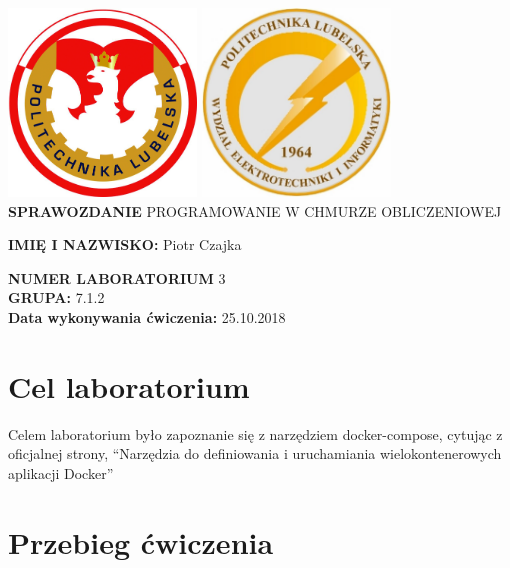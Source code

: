 \documentclass[12pt]{article}
\begin{document}
    \centering
    \includegraphics[width=5cm, height=5cm,]{herbPL.jpg}
    \hspace{2cm}
    \includegraphics[width=5cm, height=5cm]{herbWEII.jpg}\\
    \vspace{2cm}
    {\Huge \textbf{SPRAWOZDANIE}}
    \vspace{2cm}
    \newline
    {\large PROGRAMOWANIE W CHMURZE OBLICZENIOWEJ}
    \vfill

    \raggedright{}

    \textbf{IMIĘ I NAZWISKO:} Piotr Czajka

    \textbf{NUMER LABORATORIUM} 3\\
    \textbf{GRUPA:} 7.1.2\\
    \textbf{Data wykonywania ćwiczenia:} 25.10.2018\\

    \newpage

    \tableofcontents{}

    \newpage

    \section{Cel laboratorium}
    Celem laboratorium było zapoznanie się z narzędziem docker-compose, cytując z oficjalnej strony, ``Narzędzia do definiowania i uruchamiania wielokontenerowych aplikacji Docker''\

    \section{Przebieg ćwiczenia}
\end{document}

